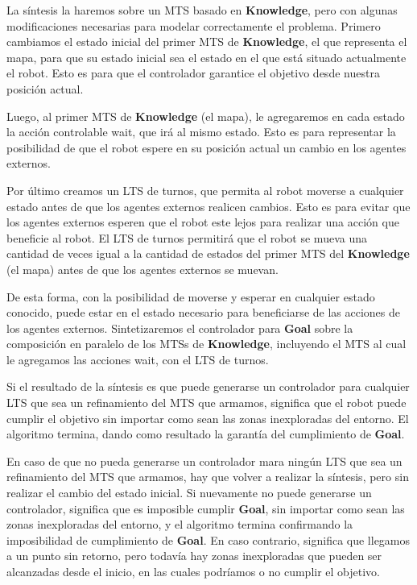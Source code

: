 \vspace{\baselineskip}
La síntesis la haremos sobre un MTS basado en \textbf{Knowledge}, pero con algunas modificaciones necesarias para modelar correctamente el problema.
Primero cambiamos el estado inicial del primer MTS de \textbf{Knowledge}, el que representa el mapa, para que su estado inicial sea el estado en el que está
situado actualmente el robot. Esto es para que el controlador garantice el objetivo desde nuestra posición actual.

\vspace{\baselineskip}
Luego, al primer MTS de \textbf{Knowledge} (el mapa), le agregaremos en cada estado la acción controlable wait, que irá al mismo estado.
Esto es para representar la posibilidad de que el robot espere en su posición actual un cambio en los agentes externos.

\vspace{\baselineskip}
Por último creamos un LTS de turnos, que permita al robot moverse a cualquier estado antes de que los agentes externos realicen cambios. Esto es para evitar que los
agentes externos esperen que el robot este lejos para realizar una acción que beneficie al robot. El LTS de turnos permitirá que el robot se mueva una cantidad
de veces igual a la cantidad de estados del primer MTS del \textbf{Knowledge} (el mapa) antes de que los agentes externos se muevan.

\vspace{\baselineskip}
De esta forma, con la posibilidad de moverse y esperar en cualquier estado conocido, puede estar en el estado necesario para beneficiarse de las acciones de
los agentes externos. Sintetizaremos el controlador para \textbf{Goal} sobre la composición en paralelo de los MTSs de \textbf{Knowledge}, incluyendo el MTS al
cual le agregamos las acciones wait, con el LTS de turnos.

\vspace{\baselineskip}
Si el resultado de la síntesis es que puede generarse un controlador para cualquier LTS que sea un refinamiento del MTS que armamos, significa que el robot
puede cumplir el objetivo sin importar como sean las zonas inexploradas del entorno. El algoritmo termina, dando como resultado la garantía del cumplimiento
de \textbf{Goal}.

\vspace{\baselineskip}
En caso de que no pueda generarse un controlador mara ningún LTS que sea un refinamiento del MTS que armamos, hay que volver a realizar la síntesis, pero sin
realizar el cambio del estado inicial. Si nuevamente no puede generarse un controlador, significa que es imposible cumplir \textbf{Goal}, sin importar como sean
las zonas inexploradas del entorno, y el algoritmo termina confirmando la imposibilidad de cumplimiento de \textbf{Goal}. En caso contrario, significa que
llegamos a un punto sin retorno, pero todavía hay zonas inexploradas que pueden ser alcanzadas desde el inicio, en las cuales podríamos o no cumplir el objetivo.


